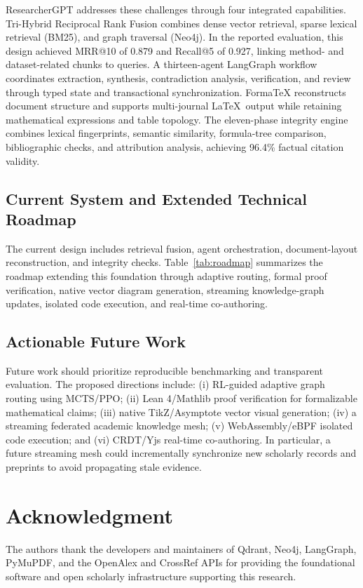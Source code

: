 \documentclass[conference]{IEEEtran}
\begin{document}
ResearcherGPT addresses these challenges through four integrated capabilities. Tri-Hybrid Reciprocal Rank Fusion combines dense vector retrieval, sparse lexical retrieval (BM25), and graph traversal (Neo4j). In the reported evaluation, this design achieved MRR@10 of 0.879 and Recall@5 of 0.927, linking method- and dataset-related chunks to queries. A thirteen-agent LangGraph workflow coordinates extraction, synthesis, contradiction analysis, verification, and review through typed state and transactional synchronization. FormaTeX reconstructs document structure and supports multi-journal \LaTeX\ output while retaining mathematical expressions and table topology. The eleven-phase integrity engine combines lexical fingerprints, semantic similarity, formula-tree comparison, bibliographic checks, and attribution analysis, achieving 96.4\% factual citation validity.

\subsection{Current System and Extended Technical Roadmap}
The current design includes retrieval fusion, agent orchestration, document-layout reconstruction, and integrity checks. Table~\ref{tab:roadmap} summarizes the roadmap extending this foundation through adaptive routing, formal proof verification, native vector diagram generation, streaming knowledge-graph updates, isolated code execution, and real-time co-authoring.

\subsection{Actionable Future Work}
Future work should prioritize reproducible benchmarking and transparent evaluation. The proposed directions include: (i) RL-guided adaptive graph routing using MCTS/PPO; (ii) Lean 4/Mathlib proof verification for formalizable mathematical claims; (iii) native TikZ/Asymptote vector visual generation; (iv) a streaming federated academic knowledge mesh; (v) WebAssembly/eBPF isolated code execution; and (vi) CRDT/Yjs real-time co-authoring. In particular, a future streaming mesh could incrementally synchronize new scholarly records and preprints to avoid propagating stale evidence.

\section*{Acknowledgment}
The authors thank the developers and maintainers of Qdrant, Neo4j, LangGraph, PyMuPDF, and the OpenAlex and CrossRef APIs for providing the foundational software and open scholarly infrastructure supporting this research.
\end{document}
